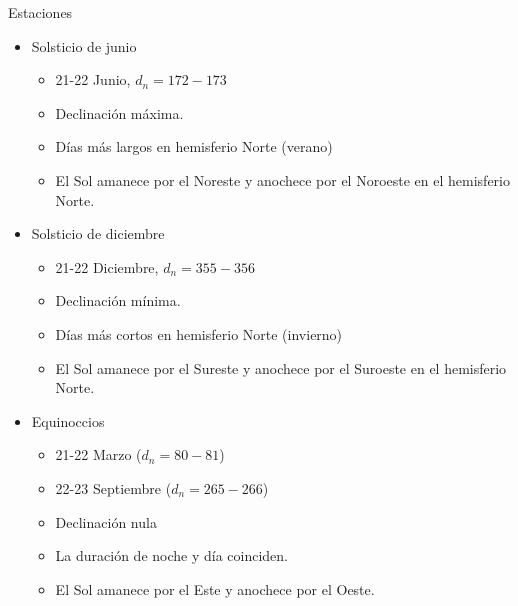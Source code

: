 \documentclass[xcolor={usenames,svgnames,dvipsnames}]{beamer}
\begin{document}
\begin{frame}[label={sec:org85308e8}]{Estaciones}
\begin{itemize}[<+->]
\item \alert{Solsticio de junio} 
\begin{itemize}[<.->]
\item 21-22 Junio, \(d_n = 172-173\)

\item Declinación máxima.

\item Días más largos en hemisferio Norte (verano)

\item El Sol amanece por el Noreste y anochece por el Noroeste en el
hemisferio Norte.
\end{itemize}

\item \alert{Solsticio de diciembre} 
\begin{itemize}[<.->]
\item 21-22 Diciembre, \(d_n = 355-356\)

\item Declinación mínima.

\item Días más cortos en hemisferio Norte (invierno)

\item El Sol amanece por el Sureste y anochece por el Suroeste en el
hemisferio Norte.
\end{itemize}

\item \alert{Equinoccios} 
\begin{itemize}[<.->]
\item 21-22 Marzo (\(d_n = 80-81\))

\item 22-23 Septiembre (\(d_n = 265-266\))

\item Declinación nula

\item La duración de noche y día coinciden.

\item El Sol amanece por el Este y anochece por el Oeste.
\end{itemize}
\end{itemize}
\end{frame}
\end{document}
